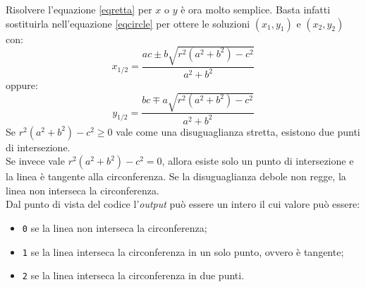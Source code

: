 Risolvere l'equazione \ref{eqretta} per $x$ o $y$ è ora molto semplice. Basta infatti sostituirla nell'equazione \ref{eqcircle} per ottere le soluzioni $(x_1, y_1)$ e $(x_2, y_2)$ con:
\begin{equation}
x_{1/2} = \frac{ac \pm b \sqrt{r^2 (a^2 + b^2)-c^2}}{a ^ 2 + b ^ 2}
\end{equation}
oppure:
\begin{equation}
y_{1/2} = \frac{bc \mp a \sqrt{r^2 (a^2 + b^2)-c^2}}{a ^ 2 + b ^ 2}
\end{equation}
Se $r^2 (a^2 + b^2)-c^2 \geq 0$ vale come una disuguaglianza stretta, esistono due punti di intersezione.\\
Se invece vale $r^2 (a^2 + b^2)-c^2 = 0$, allora esiste solo un punto di intersezione e la linea è tangente alla circonferenza. Se la disuguaglianza debole non regge, la linea non interseca la circonferenza.\\
\noindent
Dal punto di vista del codice l'\textit{output} può essere un intero il cui valore può essere:
\begin{itemize}
	\item \texttt{0} se la linea non interseca la circonferenza;
	\item \texttt{1} se la linea interseca la circonferenza in un solo punto, ovvero è tangente;
	\item \texttt{2} se la linea interseca la circonferenza in due punti.
\end{itemize}

